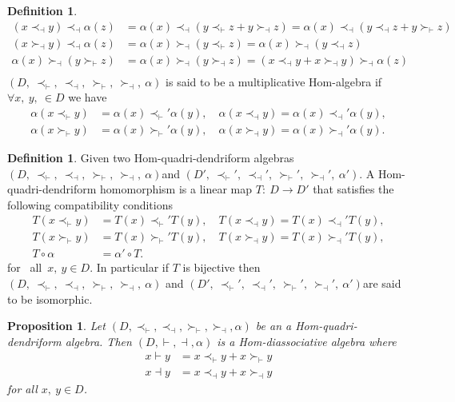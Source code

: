 \documentclass[11pt,twoside,reqno]{amsart}
\theoremstyle{plain}
\newtheorem{proposition}[thm]{Proposition}
\theoremstyle{definition}
\newtheorem{definition}[thm]{Definition}
\begin{document}
\begin{definition}
\begin{align}
(x \prec_\dashv y) \prec_\dashv \alpha(z)&=\alpha(x) \prec_\dashv (y \prec_\vdash z + y \succ_\dashv z)=\alpha(x) \prec_\dashv (y \prec_\dashv z + y \succ_\vdash z) \label{Hq9} \\
(x \succ_\dashv y) \prec_\dashv \alpha(z) &= \alpha(x) \succ_\dashv (y \prec_\vdash z) = \alpha(x) \succ_\dashv (y \prec_\dashv z)\label{Hq10} \\
\alpha(x)\succ_\dashv (y \succ_\vdash z) &= \alpha(x) \succ_\dashv (y \succ_\dashv z) = (x \prec_\dashv y + x \succ_\dashv y) \succ_\dashv \alpha(z)  \label{Hq11}\\
\end{align}
$(D,\  \prec_\vdash,\  \prec_\dashv,\  \succ_\vdash,\  \succ_\dashv,\  \alpha) $ is said to be a multiplicative Hom-algebra if $\forall x,\  y,\ \in D $ we have 
\begin{align*}
    \alpha(x \prec_\vdash y) &= \alpha(x) \prec_\vdash' \alpha(y)  ,\quad
\alpha(x \prec_\dashv y) = \alpha(x) \prec_\dashv' \alpha(y) ,\\
\alpha(x \succ_\vdash y) &= \alpha(x) \succ_\vdash' \alpha(y)  ,\quad 
\alpha(x \succ_\dashv y) = \alpha(x) \succ_\dashv' \alpha(y).
\end{align*}
\end{definition}
\begin{definition}
Given two Hom-quadri-dendriform algebras$(D,\  \prec_\vdash,\  \prec_\dashv,\  \succ_\vdash,\  \succ_\dashv,\  \alpha) $and $(D',\  \prec_\vdash',\  \prec_\dashv',\  \succ_\vdash',\  \succ_\dashv',\  \alpha') $. A Hom-quadri-dendriform homomorphism is a linear map $T : \ D \to D'$ that satisfies the following compatibility conditions
\begin{align*}
T(x \prec_\vdash y) &=T(x) \prec_\vdash' T(y) ,\quad T(x \prec_\dashv y) = T(x) \prec_\dashv'T(y) ,\\
T(x \succ_\vdash y) &=T(x) \succ_\vdash' T(y) ,\quad T(x \succ_\dashv y) =T(x) \succ_\dashv' T(y),\\ 
T \circ \alpha&=\alpha' \circ T.
\end{align*}
for \ all\ $x ,\  y\in D$. In particular  if $T$ is bijective  then \\ $(D,\  \prec_\vdash,\  \prec_\dashv,\  \succ_\vdash,\  \succ_\dashv,\  \alpha) $ and $(D',\  \prec_\vdash',\  \prec_\dashv',\  \succ_\vdash',\  \succ_\dashv',\  \alpha') $are said to be isomorphic.
\end{definition}
\begin{proposition}\label{qpro} 
Let $(D, \prec_\vdash,\prec_\dashv,\succ_\vdash,\succ_\dashv,\alpha) $ be an a Hom-quadri-dendriform algebra. Then $(D,\vdash,\dashv,\alpha)$ is a Hom-diassociative algebra  where
\begin{align*}
x \vdash y &= x \prec_\vdash y + x \succ_\vdash y  \\
x \dashv y &= x \prec_\dashv y + x \succ_\dashv y  
\end{align*}
for all $x ,\ y \in D$.
\end{proposition}
\end{document}
